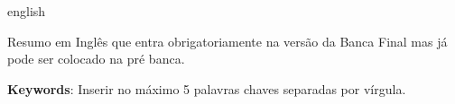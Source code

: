 \begin{resumo}[Abstract]
	
	\begin{otherlanguage*}{english}
		
	Resumo em Inglês que entra obrigatoriamente na versão da Banca Final mas já pode ser colocado na pré banca.
	
    \textbf{Keywords}: Inserir no máximo 5 palavras chaves separadas por vírgula.
		
	\end{otherlanguage*}

\end{resumo} 
